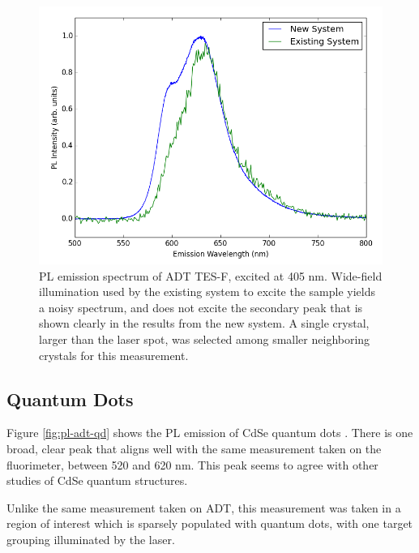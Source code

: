 \begin{figure}[h]
    \centering
    \includegraphics[width=.8\textwidth]{./img/tesf-2.png}%
    \caption[PL emission spectrum of ADT TES-F, excited at 405nm.]{PL emission spectrum of ADT TES-F, excited at 405 nm.
    Wide-field illumination used by the existing system to excite the sample
    yields a noisy spectrum, and does not excite the secondary peak that is 
    shown clearly in the results from the new system. A single crystal, larger than the laser spot, was selected among smaller neighboring crystals for this measurement. %
    }
    \label{fig:pl-adt-tesf}
\end{figure}

\subsection{ Quantum Dots}
Figure \ref{fig:pl-adt-qd} shows the PL emission of CdSe quantum dots . There is one broad, clear peak that aligns well with the same measurement taken on the fluorimeter, between 520 and 620 nm. This peak seems to agree with other studies of CdSe quantum structures.\cite{empedocles_photoluminescence_1996}

Unlike the same measurement taken on ADT, this measurement was taken in a region of interest which is sparsely populated with quantum dots, with one target grouping illuminated by the laser.

